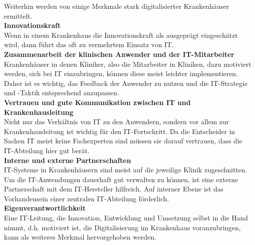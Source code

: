 Weiterhin werden von \cite{huebner2019} einige Merkmale stark digitalisierter Krankenhäuser ermittelt.
\vspace{\parheadvspace}\\
\textbf{Innovationskraft}\\
Wenn in einem Krankenhaus die Innovationskraft als ausgeprägt eingeschätzt wird, dann führt das oft zu vermehrtem Einsatz von IT. 
\vspace{\parheadvspace}\\
\textbf{Zusammenarbeit der klinischen Anwender und der IT-Mitarbeiter}\\
Krankenhäuser in denen Kliniker, also die Mitarbeiter in Kliniken, dazu motiviert werden, sich bei IT einzubringen, können diese meist leichter implementieren. Daher ist es wichtig, das Feedback der Anwender zu nutzen und die IT-Strategie und -Taktik entsprechend anzupassen.
\vspace{\parheadvspace}\\
\textbf{Vertrauen und gute Kommunikation zwischen IT und Krankenhausleitung}\\
Nicht nur das Verhältnis von IT zu den Anwendern, sondern vor allem zur Krankenhausleitung ist wichtig für den IT-Fortschritt. Da die Entscheider in Sachen IT meist keine Fachexperten sind müssen sie darauf vertrauen, dass die IT-Abteilung hier gut berät.
\vspace{\parheadvspace}\\
\textbf{Interne und externe Partnerschaften}\\
IT-Systeme in Krankenhäusern sind meist auf die jeweilige Klinik zugeschnitten. Um die IT-Anwendungen dauerhaft gut verwalten zu können, ist eine externe Partnerschaft mit dem IT-Hersteller hilfreich. Auf interner Ebene ist das Vorhandensein einer zentralen IT-Abteilung förderlich.
\vspace{\parheadvspace}\\
\textbf{Eigenverantwortlichkeit}\\
Eine IT-Leitung, die Innovation, Entwicklung und Umsetzung selbst in die Hand nimmt, d.h. motiviert ist, die Digitalisierung im Krankenhaus voranzubringen, kann als weiteres Merkmal hervorgehoben werden.

